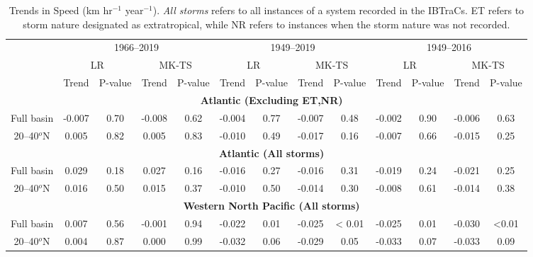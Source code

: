 \documentclass[wcd,manuscript]{copernicus}
\begin{document}
\begin{table*}[t]
  \caption{Trends in Speed (km hr$^{-1}$ year$^{-1}$). \emph{All storms} refers to all instances of a
    system recorded in the IBTraCs. ET refers to storm nature designated as extratropical, while NR refers to instances
    when the storm nature was not recorded. }

\begin{tabular}{|c|cccc|cccc|cccc|}
\hline
& \multicolumn{4}{|c|}{1966--2019}& \multicolumn{4}{|c|}{1949--2019} &  \multicolumn{4}{|c|}{1949--2016}\\
& \multicolumn{2}{c}{LR} & \multicolumn{2}{c|}{MK-TS}& \multicolumn{2}{c}{LR} & \multicolumn{2}{c|}{MK-TS} & \multicolumn{2}{c}{LR} & \multicolumn{2}{c|}{MK-TS}\\
& Trend & P-value & Trend & P-value & Trend & P-value & Trend & P-value & Trend & P-value & Trend & P-value\\
\hline

&  \multicolumn{11}{c}{\bf{Atlantic (Excluding ET,NR)}}  &   \\
Full basin    & -0.007 & 0.70 & -0.008 & 0.62 & -0.004 & 0.77 & -0.007 & 0.48 & -0.002 & 0.90 & -0.006 & 0.63\\
 20--40$^o$N   &  0.005 & 0.82 &  0.005 & 0.83 & -0.010 & 0.49 & -0.017 & 0.16 & -0.007 & 0.66 & -0.015 & 0.25\\
\hline
\hline
&  \multicolumn{11}{c}{\bf{Atlantic (All storms)}}  &   \\
Full basin    & 0.029 & 0.18 &  0.027 & 0.16  & -0.016 & 0.27 & -0.016 & 0.31 & -0.019 & 0.24 & -0.021 & 0.25\\
20--40$^o$N   & 0.016 & 0.50 &  0.015 & 0.37  & -0.010 & 0.50 & -0.014 & 0.30 & -0.008 & 0.61 & -0.014 & 0.38\\

\hline
&  \multicolumn{11}{c}{\bf{Western North Pacific (All storms)}}  &   \\
Full basin    &  0.007 & 0.56 & -0.001 & 0.94 & -0.022 & 0.01 & -0.025 & < 0.01  & -0.025 & 0.01 & -0.030 & <0.01 \\ 
20--40$^o$N   &  0.004 & 0.87 &  0.000 & 0.99 & -0.032 & 0.06 & -0.029 & 0.05 & -0.033 & 0.07 & -0.033 & 0.09\\
\hline
\end{tabular}
\label{tab:trend_speed}
\end{table*}

\end{document}
